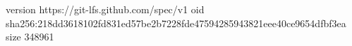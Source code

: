 version https://git-lfs.github.com/spec/v1
oid sha256:218dd3618102fd831ed57be2b7228fde47594285943821eee40ce9654dfbf3ea
size 348961
